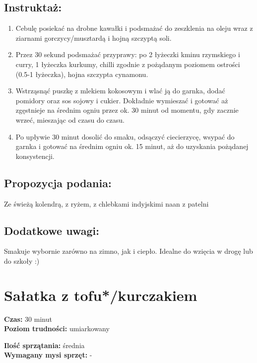 \documentclass[a4paper,10pt]{book}
\begin{document}
\section*{Instruktaż:} \begin{enumerate} \item Cebulę posiekać na drobne kawałki i podsmażać do zeszklenia na oleju wraz z ziarnami gorczycy/musztardą i hojną szczyptą soli. \item Przez 30 sekund podsmażać przyprawy: po 2 łyżeczki kminu rzymskiego i curry, 1 łyżeczka kurkumy, chilli zgodnie z pożądanym poziomem ostrości (0.5-1 łyżeczka), hojna szczypta cynamonu. \item Wstrząsnąć puszkę z mlekiem kokosowym i wlać ją do garnka, dodać pomidory oraz sos sojowy i cukier. Dokładnie wymieszać i gotować aż zgęstnieje na średnim ogniu przez ok. 30 minut od momentu, gdy zacznie wrzeć, mieszając od czasu do czasu. \item Po upływie 30 minut dosolić do smaku, odsączyć ciecierzycę, wsypać do garnka i gotować na średnim ogniu ok. 15 minut, aż do uzyskania pożądanej konsystencji. \end{enumerate}

\vspace{0.5cm}

\small \section*{Propozycja podania:} Ze świeżą kolendrą, z ryżem, z chlebkami indyjskimi naan z patelni

\vspace{0.3cm}

\section*{Dodatkowe uwagi:} Smakuje wybornie zarówno na zimno, jak i ciepło. Idealne do wzięcia w drogę lub do szkoły :)



\chapter{Sałatka z tofu*/kurczakiem}

\vspace{0.1cm}
\small
\begin{minipage}{0.45\textwidth}
    \noindent \textbf{Czas:} 30 minut \\
    \textbf{Poziom trudności:} umiarkowany
\end{minipage}
\begin{minipage}{0.45\textwidth}
    \noindent \textbf{Ilość sprzątania:} średnia\\
    \textbf{Wymagany mysi sprzęt:} -
\end{minipage}
\normalsize
\vspace{0.5cm}
\end{document}
